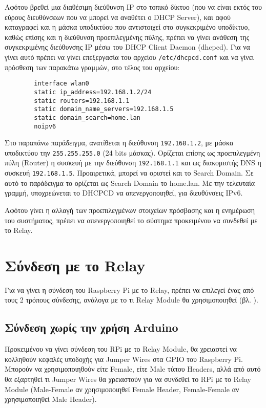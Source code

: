 		Αφότου βρεθεί μια διαθέσιμη διεύθυνση IP στο τοπικό δίκτυο (που να είναι εκτός του εύρους διευθύνσεων που να μπορεί να αναθέτει ο DHCP Server), και αφού καταγραφεί και η μάσκα υποδικτύου που αντιστοιχεί στο συγκεκριμένο υποδίκτυο, καθώς επίσης και η διεύθυνση προεπιλεγμένης πύλης, πρέπει να γίνει ανάθεση της συγκεκριμένης διεύθυνσης IP μέσω του DHCP Client Daemon (dhcpcd). Για να γίνει αυτό πρέπει να γίνει επεξεργασία του αρχείου \verb|/etc/dhcpcd.conf| και να γίνει πρόσθεση των παρακάτω γραμμών, στο τέλος του αρχείου:

		\begin{lstlisting}
		interface wlan0
		static ip_address=192.168.1.2/24
		static routers=192.168.1.1
		static domain_name_servers=192.168.1.5
		static domain_search=home.lan
		noipv6\end{lstlisting}

		Στο παραπάνω παράδειγμα, ανατίθεται η διεύθυνση \verb|192.168.1.2|, με μάσκα υποδικτύου την \verb|255.255.255.0| (24 bits μάσκας). Ορίζεται επίσης ως προεπιλεγμένη πύλη (Router) η συσκευή με την διεύθυνση \verb|192.168.1.1| και ως διακομιστής DNS η συσκευή \verb|192.168.1.5|. Προαιρετικά, μπορεί να οριστεί και το Search Domain. Σε αυτό το παράδειγμα το ορίζεται ως Search Domain το home.lan. Με την τελευταία γραμμή, υποχρεώνεται το DHCPCD να απενεργοποιηθεί, για διευθύνσεις IPv6.

	Αφότου γίνει η αλλαγή των προεπιλεγμένων στοιχείων πρόσβασης και η ενημέρωση του συστήματος, πρέπει να απενεργοποιηθεί το σύστημα προκειμένου να συνδεθεί με το Relay. 

\section{Σύνδεση με το Relay}
	Για να γίνει η σύνδεση του Raspberry Pi με το Relay, πρέπει να επιλεγεί ένας από τους 2 τρόπους σύνδεσης, ανάλογα με το τι Relay Module θα χρησιμοποιηθεί (βλ. ).

	\subsection{Σύνδεση χωρίς την χρήση Arduino}
		\label{subsec:gpio_conn}
		Προκειμένου να γίνει σύνδεση του RPi με το Relay Module, θα χρειαστεί να κολληθούν κεφαλές υποδοχής για Jumper Wires στα GPIO του Raspberry Pi. Μπορούν να χρησιμοποιηθούν είτε Female, είτε Male τύπου Headers, αλλά από αυτό θα εξαρτηθεί τι Jumper Wires θα χρειαστούν για να συνδεθεί το RPi με το Relay Module (Male-Female αν χρησιμοποιηθεί Female Header, Female-Female αν χρησιμοποιηθεί Male Header).

